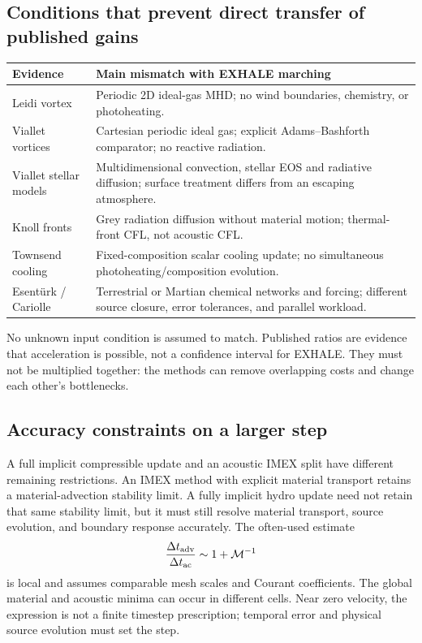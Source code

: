 \documentclass[english,a4paper]{my_memo}
\begin{document}
\subsection{Conditions that prevent direct transfer of published gains}
\begin{center}
\begin{tabularx}{\textwidth}{@{}p{}X@{}}
\toprule
Evidence & Main mismatch with EXHALE marching\\
\midrule
Leidi vortex & Periodic 2D ideal-gas MHD; no wind boundaries, chemistry, or photoheating.\\
Viallet vortices & Cartesian periodic ideal gas; explicit Adams--Bashforth comparator; no reactive radiation.\\
Viallet stellar models & Multidimensional convection, stellar EOS and radiative diffusion; surface treatment differs from an escaping atmosphere.\\
Knoll fronts & Grey radiation diffusion without material motion; thermal-front CFL, not acoustic CFL.\\
Townsend cooling & Fixed-composition scalar cooling update; no simultaneous photoheating/composition evolution.\\
Esent\"urk / Cariolle & Terrestrial or Martian chemical networks and forcing; different source closure, error tolerances, and parallel workload.\\
\bottomrule
\end{tabularx}
\end{center}
No unknown input condition is assumed to match. Published ratios are evidence that acceleration is possible, not a confidence interval for EXHALE. They must not be multiplied together: the methods can remove overlapping costs and change each other's bottlenecks.

\subsection{Accuracy constraints on a larger step}
A full implicit compressible update and an acoustic IMEX split have different remaining restrictions. An IMEX method with explicit material transport retains a material-advection stability limit. A fully implicit hydro update need not retain that same stability limit, but it must still resolve material transport, source evolution, and boundary response accurately. The often-used estimate
\begin{equation}
 \frac{\Delta t_{\rm adv}}{\Delta t_{\rm ac}}\sim1+\mathcal M^{-1}
\end{equation}
is local and assumes comparable mesh scales and Courant coefficients. The global material and acoustic minima can occur in different cells. Near zero velocity, the expression is not a finite timestep prescription; temporal error and physical source evolution must set the step.
\end{document}
